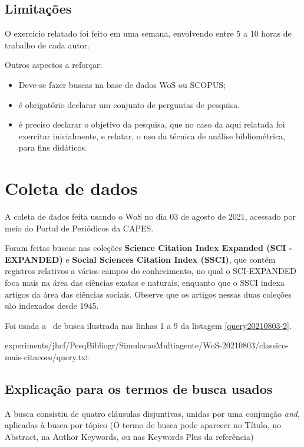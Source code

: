 \subsection{Limitações} O exercício relatado foi feito em uma semana, envolvendo entre 5 a 10 horas de trabalho de cada autor.

Outros aspectos a reforçar:
\begin{itemize}
   
\item Deve-se fazer buscas na base de dados WoS ou SCOPUS;
\item é obrigatório declarar um conjunto de perguntas de pesquisa.
\item é preciso declarar o objetivo da pesquisa, que no caso da aqui relatada foi exercitar inicialmente, e relatar, o uso da técnica de análise bibliométrica, para fins didáticos.
\end{itemize}


\section{Coleta de dados\label{MASSA:coleta}}

A coleta de dados feita usando o WoS no dia 03 de agosto de 2021, acessado por meio do Portal de Periódicos da CAPES.

Foram feitas buscas nas coleções \textbf{Science  Citation  Index  Expanded (SCI -EXPANDED)} e \textbf{Social  Sciences  Citation  Index (SSCI)}, que contém registros relativos a vários campos do conhecimento, no qual o SCI-EXPANDED foca mais na área das ciências exatas e naturais, enquanto que o SSCI indexa artigos da área das ciências sociais. Observe que os artigos nessas duas coleções são indexados desde 1945. 

Foi usada a \query\  de busca ilustrada nas linhas 1 a 9 da listagem \ref{query20210803-2}.


{experiments/jhcf/PesqBibliogr/SimulacaoMultiagente/WoS-20210803/classico-mais-citacoes/query.txt}

\subsection{Explicação para os termos de busca usados\label{MASSA:query}}

A busca consistiu de quatro cláusulas disjuntivas, unidas por uma conjunção \textit{and}, aplicadas à busca por tópico (O termo de busca pode aparecer no Título, no Abstract, na Author Keywords, ou nas Keywords Plus da referência)

